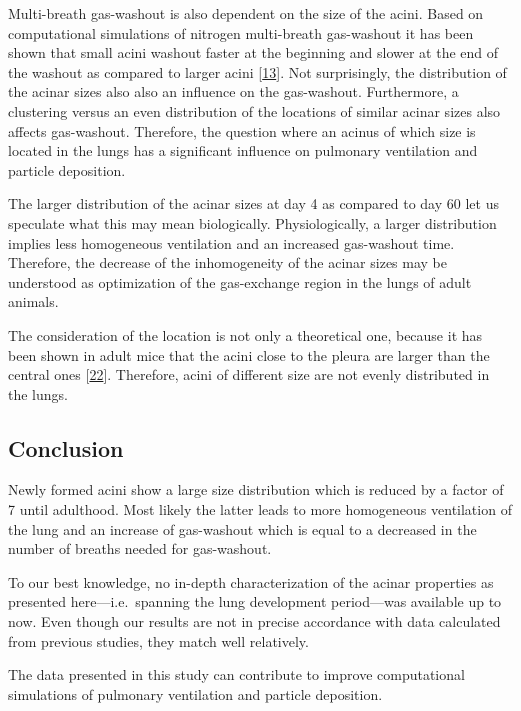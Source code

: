 \documentclass[
  american,
]{article}
\begin{document}
Multi-breath gas-washout is also dependent on the size of the acini.
Based on computational simulations of nitrogen multi-breath gas-washout it has been shown that small acini washout faster at the beginning and slower at the end of the washout as compared to larger acini {[}\protect\hyperlink{ref-eb0gk6VO}{13}{]}.
Not surprisingly, the distribution of the acinar sizes also also an influence on the gas-washout.
Furthermore, a clustering versus an even distribution of the locations of similar acinar sizes also affects gas-washout.
Therefore, the question where an acinus of which size is located in the lungs has a significant influence on pulmonary ventilation and particle deposition.

The larger distribution of the acinar sizes at day 4 as compared to day 60 let us speculate what this may mean biologically.
Physiologically, a larger distribution implies less homogeneous ventilation and an increased gas-washout time.
Therefore, the decrease of the inhomogeneity of the acinar sizes may be understood as optimization of the gas-exchange region in the lungs of adult animals.

The consideration of the location is not only a theoretical one, because it has been shown in adult mice that the acini close to the pleura are larger than the central ones {[}\protect\hyperlink{ref-RGBeCf8v}{22}{]}.
Therefore, acini of different size are not evenly distributed in the lungs.

\hypertarget{conclusion}{%
\subsection{Conclusion}\label{conclusion}}

Newly formed acini show a large size distribution which is reduced by a factor of 7 until adulthood.
Most likely the latter leads to more homogeneous ventilation of the lung and an increase of gas-washout which is equal to a decreased in the number of breaths needed for gas-washout.

To our best knowledge, no in-depth characterization of the acinar properties as presented here---i.e.~spanning the lung development period---was available up to now.
Even though our results are not in precise accordance with data calculated from previous studies, they match well relatively.

The data presented in this study can contribute to improve computational simulations of pulmonary ventilation and particle deposition.
\end{document}

